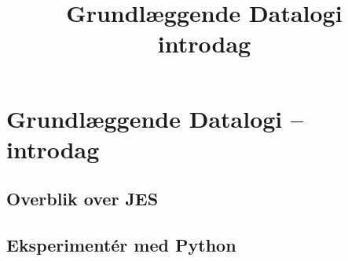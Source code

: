 \documentclass[10pt]{article}
\title{Grundlæggende Datalogi \\ introdag}
\author{ }
\begin{document}
\section*{Grundlæggende Datalogi -- introdag}
\subsection*{Overblik over JES}
\subsection*{Eksperimentér med Python}
\end{document}
